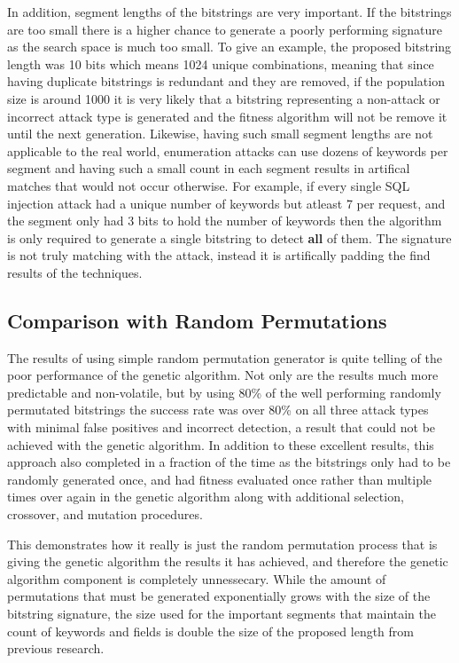 In addition, segment lengths of the bitstrings are very important.  If the bitstrings are too small there is a higher chance to generate a poorly performing signature as the search space is much too small.  To give an example, the proposed bitstring length was 10 bits which means 1024 unique combinations, meaning that since having duplicate bitstrings is redundant and they are removed, if the population size is around 1000 it is very likely that a bitstring representing a non-attack or incorrect attack type is generated and the fitness algorithm will not be remove it until the next generation.  Likewise, having such small segment lengths are not applicable to the real world, enumeration attacks can use dozens of keywords per segment and having such a small count in each segment results in artifical matches that would not occur otherwise.  For example, if every single SQL injection attack had a unique number of keywords but atleast 7 per request, and the segment only had 3 bits to hold the number of keywords then the algorithm is only required to generate a single bitstring to detect \textbf{all} of them.  The signature is not truly matching with the attack, instead it is artifically padding the find results of the techniques.

\subsection{Comparison with Random Permutations}\label{sec:randDiscussion}

The results of using simple random permutation generator is quite telling of the poor performance of the genetic algorithm.  Not only are the results much more predictable and non-volatile, but by using 80\% of the well performing randomly permutated bitstrings the success rate was over 80\% on all three attack types with minimal false positives and incorrect detection, a result that could not be achieved with the genetic algorithm.  In addition to these excellent results, this approach also completed in a fraction of the time as the bitstrings only had to be randomly generated once, and had fitness evaluated once rather than multiple times over again in the genetic algorithm along with additional selection, crossover, and mutation procedures.

This demonstrates how it really is just the random permutation process that is giving the genetic algorithm the results it has achieved, and therefore the genetic algorithm component is completely unnessecary.  While the amount of permutations that must be generated exponentially grows with the size of the bitstring signature, the size used for the important segments that maintain the count of keywords and fields is double the size of the proposed length from previous research.

